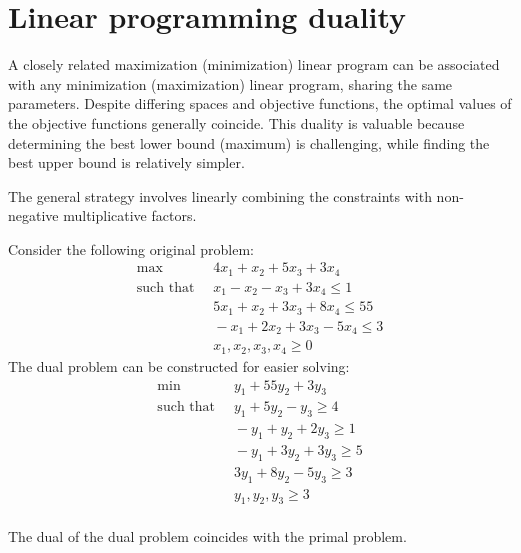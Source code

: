 \section{Linear programming duality}

A closely related maximization (minimization) linear program can be associated with any minimization (maximization) linear program, sharing the same parameters.
Despite differing spaces and objective functions, the optimal values of the objective functions generally coincide. 
This duality is valuable because determining the best lower bound (maximum) is challenging, while finding the best upper bound is relatively simpler.

The general strategy involves linearly combining the constraints with non-negative multiplicative factors.
\begin{example}
    Consider the following original problem:
    \begin{align*}
        \max                      \:&\: 4x_1+x_2+5x_3+3x_4          \\
        \text{such that }     &\: x_1-x_2-x_3+3x_4 \leq 1     \\
                                    &\: 5x_1+x_2+3x_3+8x_4 \leq 55  \\
                                    &\: -x_1+2x_2+3x_3-5x_4 \leq 3  \\
                                    &\: x_1,x_2,x_3,x_4 \geq 0      
    \end{align*}
    The dual problem can be constructed for easier solving:
    \begin{align*}
        \min                      \:&\: y_1+55y_2+3y_3              \\
        \text{such that }     &\: y_1+5y_2-y_3 \geq 4         \\
                                    &\: -y_1+y_2+2y_3 \geq 1        \\
                                    &\: -y_1+3y_2+3y_3 \geq 5       \\
                                    &\: 3y_1+8y_2-5y_3 \geq 3       \\   
                                    &\: y_1,y_2,y_3 \geq 3          \\
    \end{align*}
\end{example}
\begin{property}
    The dual of the dual problem coincides with the primal problem.
\end{property}
